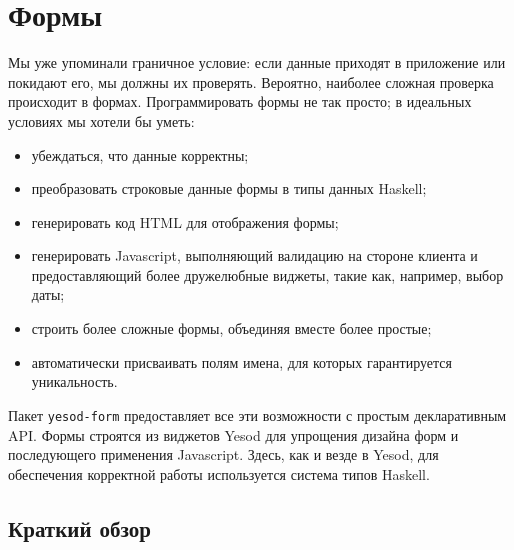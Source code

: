 \chapter{Формы}

Мы уже упоминали граничное условие: если данные приходят в приложение или покидают его,
мы должны их проверять. Вероятно, наиболее сложная проверка происходит в формах.
Программировать формы не так просто; в идеальных условиях мы хотели бы уметь:

\begin{itemize}
\item убеждаться, что данные корректны;
\item преобразовать строковые данные формы в типы данных Haskell; %
\item генерировать код HTML для отображения формы;
\item генерировать Javascript, выполняющий валидацию на стороне клиента и предоставляющий
более дружелюбные виджеты, такие как, например, выбор даты;
\item строить более сложные формы, объединяя вместе более простые;
\item автоматически присваивать полям имена, для которых гарантируется уникальность.
\end{itemize}

Пакет \lstinline'yesod-form' предоставляет все эти возможности с простым декларативным
API. Формы строятся из виджетов Yesod для упрощения дизайна форм и последующего применения
Javascript. Здесь, как и везде в Yesod, для обеспечения
корректной работы используется система типов Haskell.

\section{Краткий обзор}

